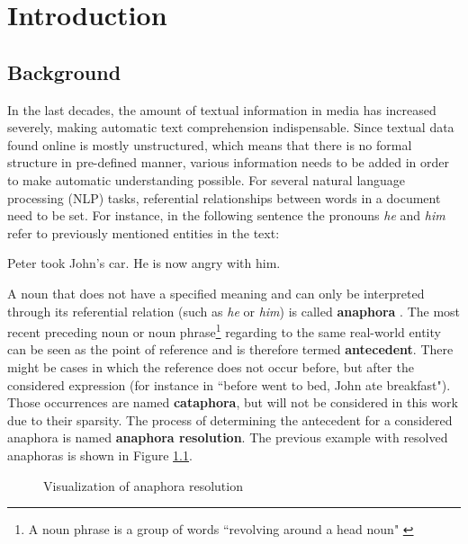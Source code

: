 \chapter{Introduction}
\label{sec:Introduction}

\section{Background}

In the last decades, the amount of textual information in media has increased severely, making automatic text comprehension indispensable. Since textual data found online is mostly unstructured, which means that there is no formal structure in pre-defined manner, various information needs to be added in order to make automatic understanding possible. For several natural language processing (NLP) tasks, referential relationships between words in a document need to be set. For instance, in the following sentence the pronouns \textit{he} and \textit{him} refer to previously mentioned entities in the text:

\begin{center}
Peter took John's car. He is now angry with him.
\end{center}

A noun that does not have a specified meaning and can only be interpreted through its referential relation (such as \textit{he} or \textit{him}) is called \textbf{anaphora} \citep{recasens2007anaphora}. The most recent preceding noun or noun phrase\footnote{A noun phrase is a group of words ``revolving around a head noun" \citep{jurafsky2014speech}} regarding to the same real-world entity can be seen as the point of reference and is therefore termed \textbf{antecedent}. There might be cases in which the reference does not occur before, but after the considered expression (for instance in ``before  went to bed, John ate breakfast"). Those occurrences are named \textbf{cataphora}, but will not be considered in this work due to their sparsity. The process of determining the antecedent for a considered anaphora is named \textbf{anaphora resolution}. The previous example with resolved anaphoras is shown in Figure \ref{figure:visofanaphora}.

\begin{figure}[h]
	\centering\sffamily
	\caption{Visualization of anaphora resolution}
	\label{figure:visofanaphora}
\end{figure}

